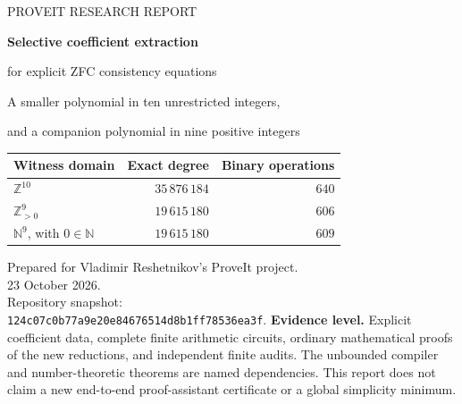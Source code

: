 \documentclass[11pt,letterpaper]{article}
\theoremstyle{definition}\newtheorem{definition}[theorem]{Definition}
\newcommand{\Z}{\mathbb Z}\newcommand{\N}{\mathbb N}\newcommand{\Pos}{\mathbb Z_{>0}}
\begin{document}
\hypersetup{pageanchor=false}
\begin{titlepage}
\vspace*{0.6in}
{\large\color{MidnightBlue} PROVEIT RESEARCH REPORT\par}
\vspace{0.35in}
{\Huge\bfseries Selective coefficient extraction\par}
\vspace{0.12in}
{\LARGE for explicit ZFC consistency equations\par}
\vspace{0.45in}
{\large A smaller polynomial in ten unrestricted integers,\par
and a companion polynomial in nine positive integers\par}
\vspace{0.55in}
\begin{center}
\renewcommand{\arraystretch}{1.35}
\begin{tabular}{lrr}
\toprule
Witness domain & Exact degree & Binary operations\\
\midrule
$\Z^{10}$ & $35\,876\,184$ & $640$\\
$\Pos^9$ & $19\,615\,180$ & $606$\\
$\N^9$, with $0\in\N$ & $19\,615\,180$ & $609$\\
\bottomrule
\end{tabular}
\end{center}
\vspace{0.45in}
Prepared for Vladimir Reshetnikov's ProveIt project.\\
23 October 2026.\\[6pt]
Repository snapshot:\\
\texttt{124c07c0b77a9e20e84676514d8b1ff78536ea3f}.
\vfill
\textbf{Evidence level.} Explicit coefficient data, complete finite arithmetic
circuits, ordinary mathematical proofs of the new reductions, and independent
finite audits. The unbounded compiler and number-theoretic theorems are named
dependencies. This report does not claim a new end-to-end proof-assistant
certificate or a global simplicity minimum.
\end{titlepage}
\hypersetup{pageanchor=true}
\end{document}
